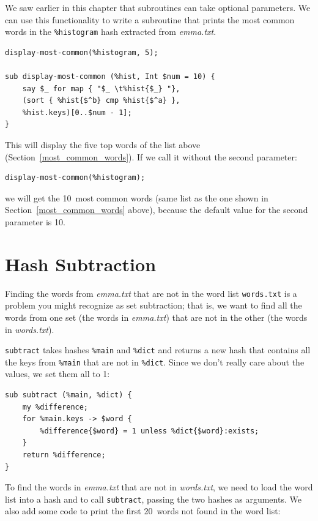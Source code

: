 We saw earlier in this chapter that subroutines can 
take optional parameters. We can use this functionality to 
write a subroutine that prints the most common words in the 
\verb'%histogram' hash extracted from \emph{emma.txt}.

\begin{verbatim}
display-most-common(%histogram, 5);

sub display-most-common (%hist, Int $num = 10) {
    say $_ for map { "$_ \t%hist{$_} "}, 
    (sort { %hist{$^b} cmp %hist{$^a} },
    %hist.keys)[0..$num - 1];
}
\end{verbatim}

This will display the five top words of the list above 
(Section~\ref{most_common_words}). If we call it without 
the second parameter:

\begin{verbatim}
display-most-common(%histogram);
\end{verbatim}

we will get the 10~most common words (same list as the one 
shown in Section~\ref{most_common_words} above), because 
the default value for the second parameter is 10.


\section{Hash Subtraction}
\label{hashsub}

Finding the words from \emph{emma.txt} that are not in the word list
{\tt words.txt} is a problem you might recognize as set
subtraction; that is, we want to find all the words from one
set (the words in \emph{emma.txt}) that are not in the other (the
words in \emph{words.txt}).

{\tt subtract} takes hashes \verb'%main' and \verb'%dict' and 
returns a new hash that contains all the keys from \verb'%main' 
that are not in \verb'%dict'.  Since we don't really care about 
the values, we set them all to 1:

\begin{verbatim}
sub subtract (%main, %dict) {
	my %difference;
	for %main.keys -> $word {
		%difference{$word} = 1 unless %dict{$word}:exists;
	}
	return %difference;
}
\end{verbatim}
%
To find the words in \emph{emma.txt} that are not in  \emph{words.txt},
we need to load the word list into a hash and to call 
{\tt subtract}, passing the two hashes as arguments. We also 
add some code to print the first 20~words not found in the 
word list:

